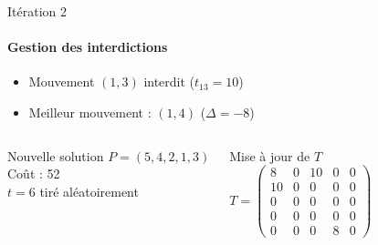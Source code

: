 \documentclass{beamer}
\begin{document}
\begin{frame}{Itération 2 }
    \framesubtitle{Gestion des interdictions}


    \begin{itemize}
        \item Mouvement \( (1,3) \) interdit (\( t_{13} = 10 \))
        \item Meilleur mouvement : \( (1,4) \) (\( \Delta = -8 \))
    \end{itemize}

    \begin{columns}
        \begin{alertblock}{Nouvelle solution}
            \( P = (5, 4, 2, 1, 3) \) \\
            Coût : 52 \\
            \( t = 6 \) tiré aléatoirement
        \end{alertblock}

        \begin{exampleblock}{Mise à jour de \( T \)}
            \[
                T = \begin{pmatrix}
                    8  & 0 & 10 & 0 & 0 \\
                    10 & 0 & 0  & 0 & 0 \\
                    0  & 0 & 0  & 0 & 0 \\
                    0  & 0 & 0  & 0 & 0 \\
                    0  & 0 & 0  & 8 & 0
                \end{pmatrix}
            \]
        \end{exampleblock}
    \end{columns}
\end{frame}
\end{document}
